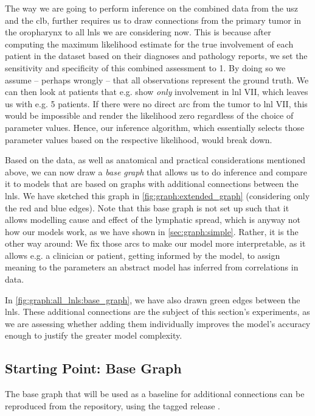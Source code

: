 \documentclass[\relativeRoot/main.tex]{subfiles}
\begin{document}
The way we are going to perform inference on the combined data from the \gls{usz} and the \gls{clb}, further requires us to draw connections from the primary tumor in the oropharynx to all \glspl{lnl} we are considering now. This is because after computing the maximum likelihood estimate for the true involvement of each patient in the dataset based on their diagnoses and pathology reports, we set the sensitivity and specificity of this combined assessment to 1. By doing so we assume -- perhaps wrongly -- that all observations represent the ground truth. We can then look at patients that e.g. show \emph{only} involvement in \gls{lnl} VII, which leaves us with e.g. 5 patients. If there were no direct arc from the tumor to \gls{lnl} VII, this would be impossible and render the likelihood zero regardless of the choice of parameter values. Hence, our inference algorithm, which essentially selects those parameter values based on the respective likelihood, would break down.

Based on the data, as well as anatomical and practical considerations mentioned above, we can now draw a \emph{base graph} that allows us to do inference and compare it to models that are based on graphs with additional connections between the \glspl{lnl}. We have sketched this graph in \cref{fig:graph:extended_graph} (considering only the red and blue edges). Note that this base graph is not set up such that it allows modelling cause and effect of the lymphatic spread, which is anyway not how our models work, as we have shown in \cref{sec:graph:simple}. Rather, it is the other way around: We fix those arcs to make our model more interpretable, as it allows e.g. a clinician or patient, getting informed by the model, to assign meaning to the parameters an abstract model has inferred from correlations in data.

In \cref{fig:graph:all_lnls:base_graph}, we have also drawn green edges between the \glspl{lnl}. These additional connections are the subject of this section's experiments, as we are assessing whether adding them individually improves the model's accuracy enough to justify the greater model complexity.

\subsection{Starting Point: Base Graph}
\label{subsec:graph:extended:base}

\begin{tcolorbox}[title=\faIcon{recycle} Reproducibility, parbox=false]
    The base graph that will be used as a baseline for additional connections can be reproduced from the  repository, using the tagged release .
\end{tcolorbox}
\end{document}
